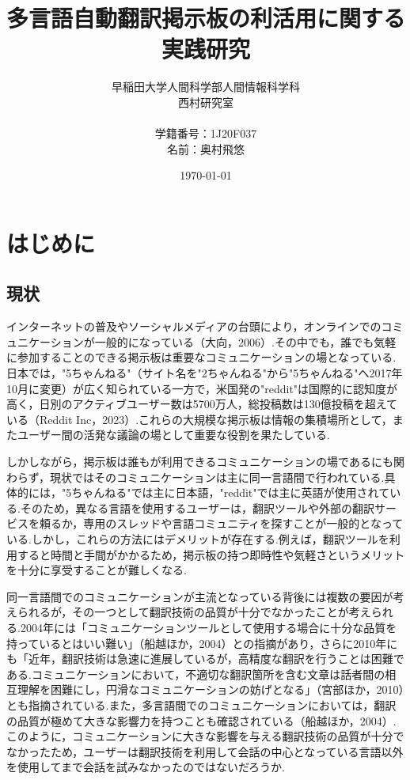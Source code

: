 \documentclass[b5paper,12pt,dvipdfmx]{jsreport}
\title{多言語自動翻訳掲示板の利活用に関する実践研究}
\author{早稲田大学人間科学部人間情報科学科\\西村研究室\\ \\学籍番号：1J20F037\\名前：奥村飛悠}
\date{\today}
\begin{document}
\maketitle

\tableofcontents

\clearpage %
\chapter{はじめに}
 
\section{現状}

インターネットの普及やソーシャルメディアの台頭により，オンラインでのコミュニケーションが一般的になっている（大向，2006）.その中でも，誰でも気軽に参加することのできる掲示板は重要なコミュニケーションの場となっている.日本では，"5ちゃんねる"（サイト名を"2ちゃんねる"から"5ちゃんねる"へ2017年10月に変更）が広く知られている一方で，米国発の"reddit"は国際的に認知度が高く，日別のアクティブユーザー数は5700万人，総投稿数は130億投稿を超えている（Reddit Inc，2023）.これらの大規模な掲示板は情報の集積場所として，またユーザー間の活発な議論の場として重要な役割を果たしている.

しかしながら，掲示板は誰もが利用できるコミュニケーションの場であるにも関わらず，現状ではそのコミュニケーションは主に同一言語間で行われている.具体的には，"5ちゃんねる"では主に日本語，"reddit"では主に英語が使用されている.そのため，異なる言語を使用するユーザーは，翻訳ツールや外部の翻訳サービスを頼るか，専用のスレッドや言語コミュニティを探すことが一般的となっている.しかし，これらの方法にはデメリットが存在する.例えば，翻訳ツールを利用すると時間と手間がかかるため，掲示板の持つ即時性や気軽さというメリットを十分に享受することが難しくなる.

同一言語間でのコミュニケーションが主流となっている背後には複数の要因が考えられるが，その一つとして翻訳技術の品質が十分でなかったことが考えられる.2004年には「コミュニケーションツールとして使用する場合に十分な品質を持っているとはいい難い」（船越ほか，2004）との指摘があり，さらに2010年にも「近年，翻訳技術は急速に進展しているが，高精度な翻訳を行うことは困難である.コミュニケーションにおいて，不適切な翻訳箇所を含む文章は話者間の相互理解を困難にし，円滑なコミュニケーションの妨げとなる」（宮部ほか，2010）とも指摘されている.また，多言語間でのコミュニケーションにおいては，翻訳の品質が極めて大きな影響力を持つことも確認されている（船越ほか，2004）.このように，コミュニケーションに大きな影響を与える翻訳技術の品質が十分でなかったため，ユーザーは翻訳技術を利用して会話の中心となっている言語以外を使用してまで会話を試みなかったのではないだろうか.
\end{document}

